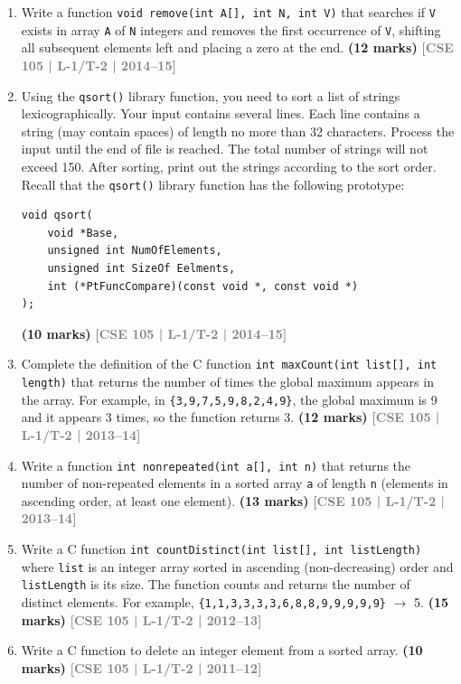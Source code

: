 \documentclass[12pt,a3paper]{article}
\newcommand{\yr}[1]{\hfill\textcolor{gray}{\small\textbf{[#1]}}}
\newcommand{\mk}[1]{\textcolor{orange!70!black}{\small\textbf{(#1 marks)}}}
\begin{document}
\begin{enumerate}
\item Write a function \texttt{void remove(int A[], int N, int V)} that searches if \texttt{V} exists in array \texttt{A} of \texttt{N} integers and removes the first occurrence of \texttt{V}, shifting all subsequent elements left and placing a zero at the end.
\mk{12} \yr{CSE 105 | L-1/T-2 | 2014--15}

\item Using the \texttt{qsort()} library function, you need to sort a list of strings lexicographically. Your input contains several lines. Each line contains a string (may contain spaces) of length no more than 32 characters. Process the input until the end of file is reached. The total number of strings will not exceed 150. After sorting, print out the strings according to the sort order. Recall that the \texttt{qsort()} library function has the following prototype:

\begin{lstlisting}
void qsort(
    void *Base,
    unsigned int NumOfElements,
    unsigned int SizeOf Eelments,
    int (*PtFuncCompare)(const void *, const void *)
);
\end{lstlisting}
\mk{10} \yr{CSE 105 | L-1/T-2 | 2014--15}

\item Complete the definition of the C function \texttt{int maxCount(int list[], int length)} that returns the number of times the global maximum appears in the array. For example, in \texttt{\{3,9,7,5,9,8,2,4,9\}}, the global maximum is 9 and it appears 3 times, so the function returns 3.
\mk{12} \yr{CSE 105 | L-1/T-2 | 2013--14}

\item Write a function \texttt{int nonrepeated(int a[], int n)} that returns the number of non-repeated elements in a sorted array \texttt{a} of length \texttt{n} (elements in ascending order, at least one element).
\mk{13} \yr{CSE 105 | L-1/T-2 | 2013--14}

\item Write a C function \texttt{int countDistinct(int list[], int listLength)} where \texttt{list} is an integer array sorted in ascending (non-decreasing) order and \texttt{listLength} is its size. The function counts and returns the number of distinct elements. For example, \texttt{\{1,1,3,3,3,3,6,8,8,9,9,9,9,9\}} $\to$ 5.
\mk{15} \yr{CSE 105 | L-1/T-2 | 2012--13}

\item Write a C function to delete an integer element from a sorted array.
\mk{10} \yr{CSE 105 | L-1/T-2 | 2011--12}


\end{enumerate}
\end{document}
